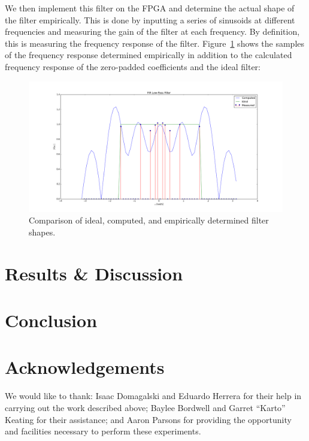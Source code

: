 \documentclass[11pt]{article}
\begin{document}
    We then implement this filter on the FPGA and determine the actual shape of the filter empirically. This is done by inputting a series of sinusoids at different frequencies and measuring the gain of the filter at each frequency. By definition, this is measuring the frequency response of the filter.  Figure~\ref{filter} shows the samples of the frequency response determined empirically in addition to the calculated frequency response of the zero-padded coefficients and the ideal filter:
    
    \noindent 
    \begin{figure}[H]
        \centering
            \includegraphics[width = \textwidth]{3_2_1_filter.png}
        \caption{Comparison of ideal, computed, and empirically determined filter shapes.}
        \label{filter}
    \end{figure}
    
    


\section{Results \& Discussion}


\section{Conclusion}


\section{Acknowledgements}
We would like to thank: Isaac Domagalski and Eduardo Herrera for their help in carrying out the work described above; Baylee Bordwell and Garret ``Karto'' Keating for their assistance; and Aaron Parsons for providing the opportunity and facilities necessary to perform these experiments.
\end{document}
